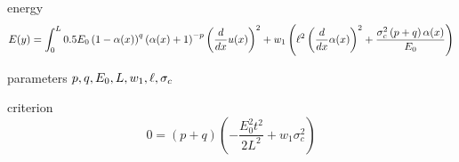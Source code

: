 \documentclass[]{article}
\begin{document}
energy
\begin{equation}
  \label{eqn:mod-energy}
E(y)  =  \int_0^L
0.5 E_{0} \left(1 - \alpha{\left(x \right)}\right)^{q} \left(\alpha{\left(x \right)} + 1\right)^{- p} \left(\frac{d}{d x} u{\left(x \right)}\right)^{2} + w_{1} \left(\ell^{2} \left(\frac{d}{d x} \alpha{\left(x \right)}\right)^{2} + \frac{\sigma_c^{2} \left(p + q\right) \alpha{\left(x \right)}}{E_{0}}\right)\end{equation}


parameters
$p, q, E_0, L, w_1, \ell, \sigma_c $

criterion
\begin{equation}
  \label{eqn:mod-criterion}
  0=
\left(p + q\right) \left(- \frac{ E_{0}^{2} t^{2}}{2L^{2}} + w_{1} \sigma_c^{2}\right)
\end{equation}
\end{document}
